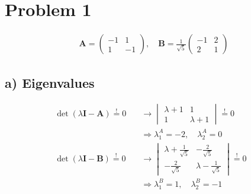 \section*{Problem 1}
\begin{align*}
	\mathbf{A} = 
	\begin{pmatrix}
	-1 & 1 \\
	1 & -1
	\end{pmatrix}
	,\quad
	\mathbf{B} = \frac{1}{\sqrt{5}}
	\begin{pmatrix}
	-1 & 2 \\
	2 & 1
	\end{pmatrix}
\end{align*}

\subsection*{a) Eigenvalues}
\begin{align*}
	\det\left(\lambda\mathbf{I-A}\right)\overset{!}{=}0
	\quad&\rightarrow
	\begin{vmatrix}
	\lambda+1 & 1 \\
	1 & \lambda +1
	\end{vmatrix}
	\overset{!}{=}0& \\
	&\Rightarrow\lambda_{1}^{A}=-2,\quad\lambda_{2}^{A}=0& \\
	\det\left(\lambda\mathbf{I-B}\right)\overset{!}{=}0
	\quad&\rightarrow
	\begin{vmatrix}
	\lambda+\frac{1}{\sqrt{5}} & -\frac{2}{\sqrt{5}} \\
	-\frac{2}{\sqrt{5}} & \lambda-\frac{1}{\sqrt{5}}
	\end{vmatrix}
	\overset{!}{=}0& \\
	&\Rightarrow\lambda_{1}^{B}=1,\quad\lambda_{2}^{B}=-1&
\end{align*}

